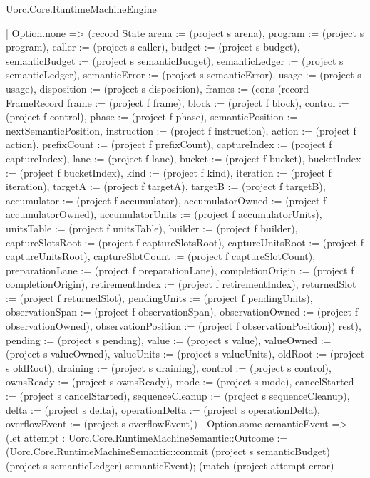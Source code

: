 \begin{lexlean}{Uorc.Core.RuntimeMachineEngine}
\begin{semanticmodule}
{            | Option.none => (record State {arena := (project s arena), program := (project s program), caller := (project s caller), budget := (project s budget), semanticBudget := (project s semanticBudget), semanticLedger := (project s semanticLedger), semanticError := (project s semanticError), usage := (project s usage), disposition := (project s disposition), frames := (cons (record FrameRecord {frame := (project f frame), block := (project f block), control := (project f control), phase := (project f phase), semanticPosition := nextSemanticPosition, instruction := (project f instruction), action := (project f action), prefixCount := (project f prefixCount), captureIndex := (project f captureIndex), lane := (project f lane), bucket := (project f bucket), bucketIndex := (project f bucketIndex), kind := (project f kind), iteration := (project f iteration), targetA := (project f targetA), targetB := (project f targetB), accumulator := (project f accumulator), accumulatorOwned := (project f accumulatorOwned), accumulatorUnits := (project f accumulatorUnits), unitsTable := (project f unitsTable), builder := (project f builder), captureSlotsRoot := (project f captureSlotsRoot), captureUnitsRoot := (project f captureUnitsRoot), captureSlotCount := (project f captureSlotCount), preparationLane := (project f preparationLane), completionOrigin := (project f completionOrigin), retirementIndex := (project f retirementIndex), returnedSlot := (project f returnedSlot), pendingUnits := (project f pendingUnits), observationSpan := (project f observationSpan), observationOwned := (project f observationOwned), observationPosition := (project f observationPosition)}) rest), pending := (project s pending), value := (project s value), valueOwned := (project s valueOwned), valueUnits := (project s valueUnits), oldRoot := (project s oldRoot), draining := (project s draining), control := (project s control), ownsReady := (project s ownsReady), mode := (project s mode), cancelStarted := (project s cancelStarted), sequenceCleanup := (project s sequenceCleanup), delta := (project s delta), operationDelta := (project s operationDelta), overflowEvent := (project s overflowEvent)})
            | Option.some semanticEvent => (let attempt : Uorc.Core.RuntimeMachineSemantic::Outcome := (Uorc.Core.RuntimeMachineSemantic::commit (project s semanticBudget) (project s semanticLedger) semanticEvent); (match (project attempt error)
}
\end{semanticmodule}
\end{lexlean}
